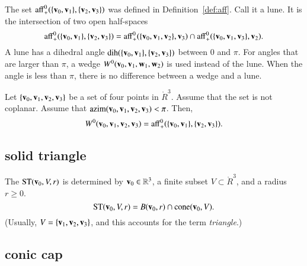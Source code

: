The set ${\operatorname{aff}}^0_+(\{{\mathbf v}_0,{\mathbf v}_1\},\{{\mathbf v}_2,{\mathbf v}_3\})$ was defined
in Definition~\ref{def:aff}.  Call it a lune.  It is the intersection
of two open half-spaces
\begin{displaymath}
{\operatorname{aff}}^0_+(\{{\mathbf v}_0,{\mathbf v}_1\},\{{\mathbf v}_2,{\mathbf v}_3\})
={\operatorname{aff}}^0_+(\{{\mathbf v}_0,{\mathbf v}_1,{\mathbf v}_2\},{\mathbf v}_3)\cap
{\operatorname{aff}}^0_+(\{{\mathbf v}_0,{\mathbf v}_1,{\mathbf v}_3\},{\mathbf v}_2).
\end{displaymath}
A lune has a dihedral angle $\operatorname{dih}(\{{\mathbf v}_0,{\mathbf v}_1\},\{{\mathbf v}_2,{\mathbf v}_3\})$ between
$0$ and $\pi$.   For angles that are larger than $\pi$,   a wedge
$W^0({\mathbf v}_0,{\mathbf v}_1,{\mathbf w}_1,{\mathbf w}_2)$ is used instead of the lune.  
When the angle is less than $\pi$, there is no difference between
a wedge and a lune.
%
%
%
%
%
%

\begin{lemma} Let $\{{\mathbf v}_0,{\mathbf v}_1,{\mathbf v}_2,{\mathbf v}_3\}$ be a set of four points
in $\ring{R}^3$.  Assume that the set is not coplanar.  Assume that
${\operatorname{azim}}({\mathbf v}_0,{\mathbf v}_1,{\mathbf v}_2,{\mathbf v}_3)<\pi$.  Then,
\begin{displaymath}W^0({\mathbf v}_0,{\mathbf v}_1,{\mathbf v}_2,{\mathbf v}_3) =
{\operatorname{aff}}^0_+(\{{\mathbf v}_0,{\mathbf v}_1\},\{{\mathbf v}_2,{\mathbf v}_3\}).\end{displaymath}
%
\end{lemma}


\subsection{solid triangle}
%

\begin{definition} The 
${\operatorname{ST}}({\mathbf v}_0,V,r)$ is determined by ${\mathbf v}_0\in\mathbb{R}^3$, a finite
subset $V\subset\ring{R}^3$, and a radius $r\ge0$.
\begin{displaymath}
{\operatorname{ST}}({\mathbf v}_0,V,r) = 
B({\mathbf v}_0,r)\cap {\operatorname{cone}}({\mathbf v}_0,V).
\end{displaymath}
(Usually, $V=\{{\mathbf v}_1,{\mathbf v}_2,{\mathbf v}_3\}$, and this accounts for
the term {\it triangle}.)
%
%
%
\end{definition}



\subsection{conic cap}
%

